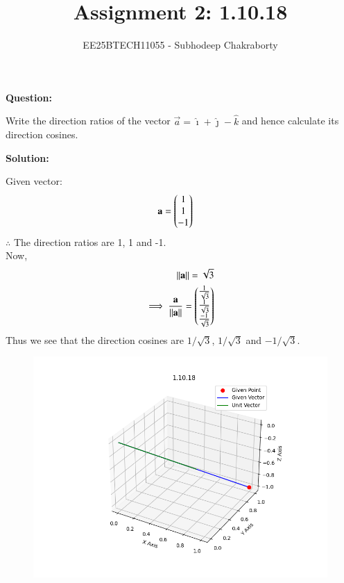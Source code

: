 \documentclass[journal,12pt,onecolumn]{IEEEtran}
\theoremstyle{remark}
\begin{document}

\vspace{3cm}

\title{Assignment 2: 1.10.18}
\author{EE25BTECH11055 - Subhodeep Chakraborty}
\maketitle
\hrulefill
\bigskip

\renewcommand{\thefigure}{\theenumi}
\renewcommand{\thetable}{\theenumi}

\textbf{Question:}\par
Write the direction ratios of the vector $\vec{a} = \hat{\imath} + \hat{\jmath} - \hat{k}$ and hence calculate its direction cosines. \par
\textbf{Solution:}\par

Given vector:
\begin{align}
 \mathbf{a} &= \begin{pmatrix}1 \\ 1 \\ -1\end{pmatrix}
\end{align}
$\therefore$ The direction ratios are 1, 1 and -1. \\
Now,
\begin{align*}
\left\lVert\mathbf{a}\right\rVert = \sqrt{3} \\
\implies \frac{\mathbf{a}}{\left\lVert\mathbf{a}\right\rVert} = \begin{pmatrix}\frac{1}{\sqrt{3}} \\ \frac{1}{\sqrt{3}} \\ \frac{-1}{\sqrt{3}}\end{pmatrix}
\end{align*}
Thus we see that the direction cosines are $1/\sqrt{3}$, $1/\sqrt{3}$ and $-1/\sqrt{3}$.
\begin{figure}[H]
    \centering
    \includegraphics{figs/plot.png}
    \caption*{}
    \label{fig:plot}
\end{figure}
\end{document}

